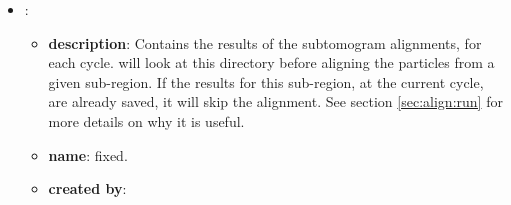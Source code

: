 \begin{itemize}
    \item {}:
    \begin{itemize}
        \item \textbf{description}: Contains the results of the subtomogram alignments, for each cycle. {\emClarity} will look at this directory before aligning the particles from a given sub-region. If the results for this sub-region, at the current cycle, are already saved, it will skip the alignment. See section \ref{sec:align:run} for more details on why it is useful.
        \item \textbf{name}: fixed.
        \item \textbf{created by}: {\emClarity} 
    \end{itemize}
\end{itemize}
